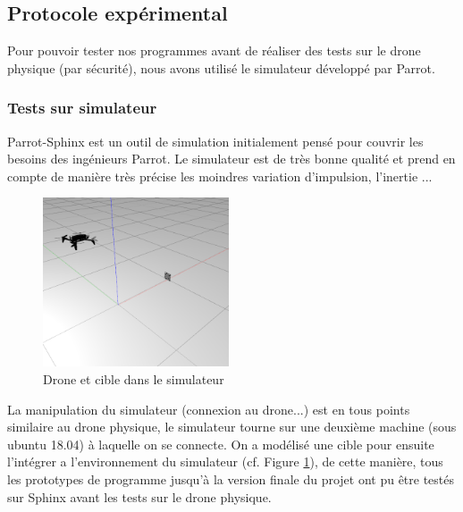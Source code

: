 \documentclass[12pt]{article}
\begin{document}
\subsection{Protocole expérimental\label{proex}}
Pour pouvoir tester nos programmes avant de réaliser des tests sur le drone physique (par sécurité), nous avons utilisé le simulateur développé par Parrot.
\subsubsection{Tests sur simulateur}
Parrot-Sphinx\cite{sphinx} est un outil de simulation initialement pensé pour couvrir les besoins des ingénieurs Parrot. Le simulateur est de très bonne qualité et prend en compte de manière très précise les moindres variation d'impulsion, l'inertie ...
\begin{figure}[H]
\centering
\includegraphics[height=5cm]{Sphinx.png}
\caption{Drone et cible dans le simulateur}
\label{fig:sphinx}
\end{figure}
La manipulation du simulateur (connexion au drone...) est en tous points similaire au drone physique, le simulateur tourne sur une deuxième machine (sous ubuntu 18.04) à laquelle on se connecte. On a modélisé une cible pour ensuite l'intégrer a l'environnement du simulateur (cf. Figure \ref{fig:sphinx}), de cette manière, tous les prototypes de programme jusqu'à la version finale du projet ont pu être testés sur Sphinx\cite{sphinx} avant les tests sur le drone physique.\\
\end{document}
